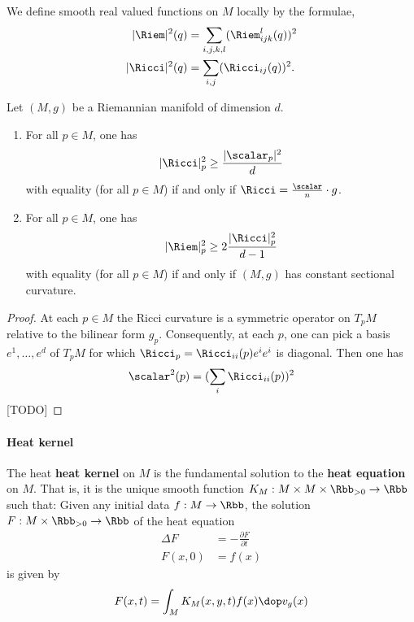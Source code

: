We define smooth real valued functions on $M$ locally by the formulae,
\begin{align}
  |\Riem|^2(q)  & = \sum_{i,j,k,l} (\Riem_{ijk}^l(q))^2 \\
  |\Ricci|^2(q) & = \sum_{i,j} (\Ricci_{ij}(q))^2.
\end{align}

\begin{proposition}
  Let $(M,g)$ be a Riemannian manifold of dimension $d$.
  \begin{enumerate}
    \item For all $p \in M$, one has
          \begin{align}
            |\Ricci|^2_p \geq \frac{|\scalar_p|^2}{d}
          \end{align}
          with equality (for all $p \in M$) if and only if $\Ricci = \frac{\scalar}{n}\cdot g$.
    \item For all $p \in M$, one has
          \begin{align}
            |\Riem|^2_p \geq 2 \frac{|\Ricci|_p^2}{d-1}
          \end{align}
          with equality (for all $p \in M$) if and only if $(M,g)$ has constant sectional curvature.
  \end{enumerate}
\end{proposition}
\begin{proof}
  At each $p \in M$ the Ricci curvature is a symmetric operator on $T_p M$ relative to the bilinear form $g_p$. Consequently, at each $p$, one can pick a basis $e^1,\dots,e^d$ of $T_p M$ for which $\Ricci_p = \Ricci_{ii}(p)e^i e^i$ is diagonal. Then one has
  \begin{align}
    \scalar^2(p) = (\sum_i\Ricci_{ii}(p))^2
  \end{align}
  [TODO]
\end{proof}
\newpage

\paragraph{Heat kernel}
The heat \textbf{heat kernel} on $M$ is the fundamental solution to the \textbf{heat equation} on $M$. That is,  it is the unique smooth function $K_M:M\times M \times \Rbb_{>0} \to \Rbb$ such that:  Given any initial data $f: M \to \Rbb$, the solution $F:M\times \Rbb_{>0} \to \Rbb$ of the heat equation
\begin{align}
  \Delta F & = - \frac{\partial F}{\partial t} \\
  F(x,0)   & = f(x)
\end{align}
is given by
\begin{align}
  F(x,t) = \int_M K_M(x,y,t)f(x) \dop v_{g}(x)
\end{align}


